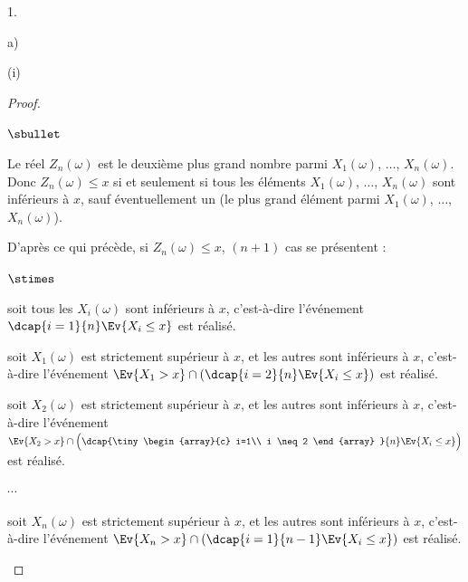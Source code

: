 \begin{noliste}{1.}
\begin{noliste}{a)}
\begin{nonoliste}{(i)}
      \begin{proof}~
        \begin{noliste}{$\sbullet$}
	  \item Le réel $Z_n(\omega)$ est le deuxième plus grand 
	  nombre parmi $X_1(\omega)$, $\ldots$, $X_n(\omega)$. Donc 
	  $Z_n(\omega) \leq x$ si et seulement si tous les éléments 
	  $X_1(\omega)$, $\ldots$, $X_n(\omega)$ sont inférieurs à 
	  $x$, sauf éventuellement un (le plus grand élément parmi
	  $X_1(\omega)$, $\ldots$, $X_n(\omega)$).
	  
	  
	  \item D'après ce qui précède, si $Z_n(\omega) \leq x$, 
	  $(n+1)$ cas se présentent :
        \end{noliste}
        \begin{liste}{$\stimes$}
          \item soit tous les $X_i(\omega)$ sont inférieurs à $x$, 
          c'est-à-dire l'événement $\dcap{i=1}{n} \Ev{X_i \leq x}$
          est réalisé.
          
          \item soit $X_1(\omega)$ est strictement 
          supérieur à $x$, et les autres sont inférieurs à $x$, 
          c'est-à-dire l'événement $\Ev{X_1 >x} \cap \left(
          \dcap{i=2}{n} \Ev{X_i \leq x}\right)$ est réalisé.
          
          \item soit $X_2(\omega)$ est strictement 
          supérieur à $x$, et les autres sont inférieurs à $x$, 
          c'est-à-dire l'événement $\Ev{X_2 >x} \cap \Big(
          \dcap{\tiny
          \begin{array}{c}
            i=1\\
            i \neq 2
          \end{array}
          }{n} \Ev{X_i \leq x}\Big)$ est réalisé.
          
          \item $\cdots$
          
          \item soit $X_n(\omega)$ est strictement 
          supérieur à $x$, et les autres sont inférieurs à $x$, 
          c'est-à-dire l'événement $\Ev{X_n >x} \cap \left(
          \dcap{i=1}{n-1} \Ev{X_i \leq x}\right)$ est réalisé.
        \end{liste}
        

\end{proof}
\end{nonoliste}
\end{noliste}
\end{noliste}

